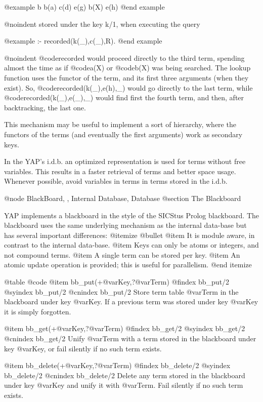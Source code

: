 {{{{{@example
b
b(a)
c(d)
e(g)
b(X)
e(h)
@end example

@noindent
stored under the key k/1, when executing the query 

@example
:- recorded(k(_),c(_),R).
@end example

@noindent
@code{recorded} would proceed directly to the third term, spending almost the 
time as if @code{a(X)} or @code{b(X)} was being searched.
 The lookup function uses the functor of the term, and its first three
arguments (when they exist). So, @code{recorded(k(_),e(h),_)} would go
directly to the last term, while @code{recorded(k(_),e(_),_)} would find
first the fourth term, and then, after backtracking, the last one.

 This mechanism may be useful to implement a sort of hierarchy, where 
the functors of the terms (and eventually the first arguments) work as 
secondary keys.

 In the YAP's i.d.b. an optimized representation is used for 
terms without free variables. This results in a faster retrieval of terms 
and better space usage. Whenever possible, avoid variables in terms in terms stored in the  i.d.b.


@node BlackBoard, , Internal Database, Database
@section The Blackboard

YAP implements a blackboard in the style of the SICStus Prolog
blackboard. The blackboard uses the same underlying mechanism as the
internal data-base but has several important differences:
@itemize @bullet
@item It is module aware, in contrast to the internal data-base.
@item Keys can only be atoms or integers, and not compound terms.
@item A single term can be stored per key.
@item An atomic update operation is provided; this is useful for
parallelism.
@end itemize


@table @code
@item bb_put(+@var{Key},?@var{Term})
@findex bb_put/2
@syindex bb_put/2
@cnindex bb_put/2
Store term table @var{Term} in the blackboard under key @var{Key}. If a
previous term was stored under key @var{Key} it is simply forgotten.

@item bb_get(+@var{Key},?@var{Term})
@findex bb_get/2
@syindex bb_get/2
@cnindex bb_get/2
Unify @var{Term} with a term stored in the blackboard under key
@var{Key}, or fail silently if no such term exists.

@item bb_delete(+@var{Key},?@var{Term})
@findex bb_delete/2
@syindex bb_delete/2
@cnindex bb_delete/2
Delete any term stored in the blackboard under key @var{Key} and unify
it with @var{Term}. Fail silently if no such term exists.

}}}}}
